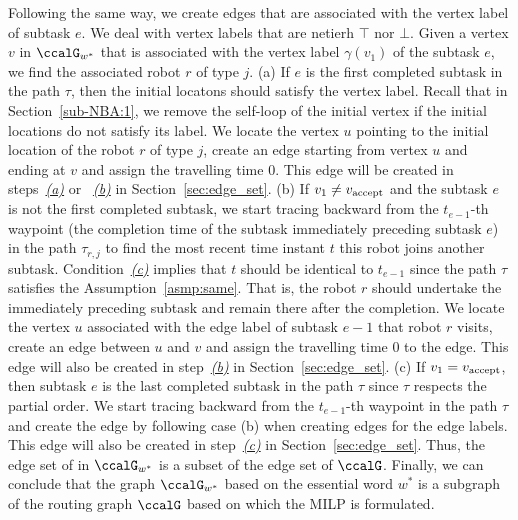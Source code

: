 \documentclass[Afour,sageh,times]{sagej}
\newcommand{\vertex}[1]{v_{\textup{#1}}}
\begin{document}
{Following the same way, we create edges that are associated with the vertex label of subtask $e$. We deal with vertex labels that are netierh $\top$ nor $\bot$. Given a vertex $v$ in $\ccalG_{w^*}$ that is associated with the vertex label $\gamma(v_1)$ of the subtask $e$,  we find  the associated robot $r$ of type $j$. (a) If $e$ is the first completed subtask in the path $\tau$, then the initial locatons should satisfy the vertex label. Recall that in Section~\ref{sub-NBA:1}, we remove the self-loop of the initial vertex if the initial locations do not satisfy its label. We locate the vertex $u$ pointing to the initial location of the robot $r$ of type $j$, create an edge starting from vertex $u$ and ending at $v$ and assign the travelling time 0. This edge will be created in steps~\hyperref[edge:vertex1]{\it (a)} or ~\hyperref[edge:vertex2]{\it (b)} in Section~\ref{sec:edge_set}.
(b) If $v_1 \neq \vertex{accept}$ and the subtask $e$ is not the first completed subtask, we start tracing backward from the $t_{e-1}$-th waypoint (the completion time of the subtask immediately preceding subtask $e$) in the path $\tau_{r,j}$ to find the most recent time instant $t$ this robot joins another subtask. Condition~\hyperref[asmp:c]{\it (c)} implies that $t$ should be identical to $t_{e-1}$ since the path $\tau$ satisfies the Assumption~\ref{asmp:same}. That is, the robot $r$ should undertake the immediately preceding subtask and remain there after the completion. We locate the vertex $u$ associated with the edge label of subtask $e-1$ that robot $r$ visits, create an edge between $u$ and $v$ and assign the travelling time 0 to the edge. This edge will also be created in step~\hyperref[edge:vertex2]{\it (b)} in Section~\ref{sec:edge_set}. (c) If $v_1 = \vertex{accept}$, then subtask $e$ is the last completed subtask in the path $\tau$ since $\tau$ respects the partial order. We start tracing backward from the $t_{e-1}$-th waypoint in the path $\tau$ and create the edge by following case (b) when creating edges for the edge labels. This edge will also be created in step~\hyperref[edge:vertex3]{\it (c)} in Section~\ref{sec:edge_set}. Thus, the edge set of in $\ccalG_{w^*}$ is a subset of the edge set of $\ccalG$. Finally, we can conclude that the graph $\ccalG_{w^*}$ based on the essential word $w^*$ is a subgraph of the routing graph $\ccalG$ based on which the MILP is formulated.


}
\end{document}
